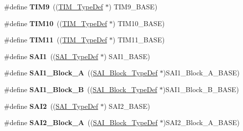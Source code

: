 \begin{DoxyCompactItemize}
\#define {\bfseries T\+I\+M9}~((\mbox{\hyperlink{struct_t_i_m___type_def}{T\+I\+M\+\_\+\+Type\+Def}} $\ast$) T\+I\+M9\+\_\+\+B\+A\+SE)
\item 
\mbox{\label{group___peripheral__declaration_ga46b2ad3f5f506f0f8df0d2ec3e767267}} 
\#define {\bfseries T\+I\+M10}~((\mbox{\hyperlink{struct_t_i_m___type_def}{T\+I\+M\+\_\+\+Type\+Def}} $\ast$) T\+I\+M10\+\_\+\+B\+A\+SE)
\item 
\mbox{\label{group___peripheral__declaration_gacfd11ef966c7165f57e2cebe0abc71ad}} 
\#define {\bfseries T\+I\+M11}~((\mbox{\hyperlink{struct_t_i_m___type_def}{T\+I\+M\+\_\+\+Type\+Def}} $\ast$) T\+I\+M11\+\_\+\+B\+A\+SE)
\item 
\mbox{\label{group___peripheral__declaration_gaa878b214698fcf74a3268d07562abbb2}} 
\#define {\bfseries S\+A\+I1}~((\mbox{\hyperlink{struct_s_a_i___type_def}{S\+A\+I\+\_\+\+Type\+Def}} $\ast$) S\+A\+I1\+\_\+\+B\+A\+SE)
\item 
\mbox{\label{group___peripheral__declaration_gaa29e42155e075c03d156d759b4e69c5c}} 
\#define {\bfseries S\+A\+I1\+\_\+\+Block\+\_\+A}~((\mbox{\hyperlink{struct_s_a_i___block___type_def}{S\+A\+I\+\_\+\+Block\+\_\+\+Type\+Def}} $\ast$)S\+A\+I1\+\_\+\+Block\+\_\+\+A\+\_\+\+B\+A\+SE)
\item 
\mbox{\label{group___peripheral__declaration_gaaa4ab9bf6de588a9309acd4bf007c4e0}} 
\#define {\bfseries S\+A\+I1\+\_\+\+Block\+\_\+B}~((\mbox{\hyperlink{struct_s_a_i___block___type_def}{S\+A\+I\+\_\+\+Block\+\_\+\+Type\+Def}} $\ast$)S\+A\+I1\+\_\+\+Block\+\_\+\+B\+\_\+\+B\+A\+SE)
\item 
\mbox{\label{group___peripheral__declaration_gac248a1f09e97346a66175a54ca7f9062}} 
\#define {\bfseries S\+A\+I2}~((\mbox{\hyperlink{struct_s_a_i___type_def}{S\+A\+I\+\_\+\+Type\+Def}} $\ast$) S\+A\+I2\+\_\+\+B\+A\+SE)
\item 
\mbox{\label{group___peripheral__declaration_gadeb449169ceaa1c73656a73be1798193}} 
\#define {\bfseries S\+A\+I2\+\_\+\+Block\+\_\+A}~((\mbox{\hyperlink{struct_s_a_i___block___type_def}{S\+A\+I\+\_\+\+Block\+\_\+\+Type\+Def}} $\ast$)S\+A\+I2\+\_\+\+Block\+\_\+\+A\+\_\+\+B\+A\+SE)

\end{DoxyCompactItemize}
